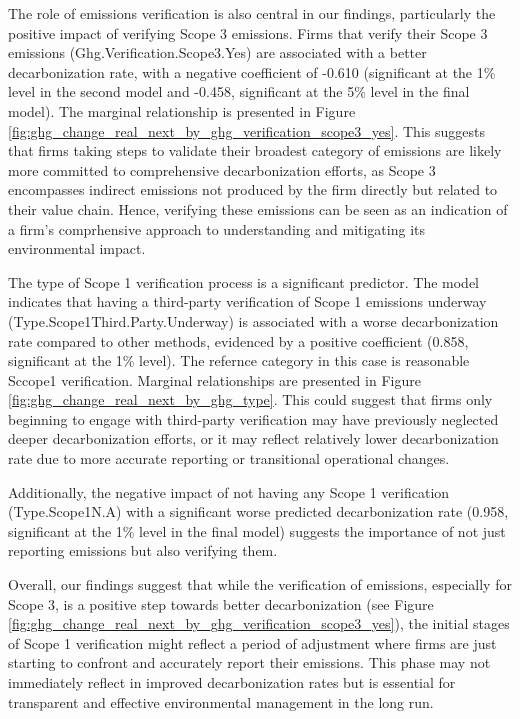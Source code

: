The role of emissions verification is also central in our findings, particularly the positive impact of verifying Scope 3 emissions. Firms that verify their Scope 3 emissions (Ghg.Verification.Scope3.Yes) are associated with a better decarbonization rate, with a negative coefficient of -0.610 (significant at the 1\% level in the second model and -0.458, significant at the 5\% level in the final model). The marginal relationship is presented in Figure \ref{fig:ghg_change_real_next_by_ghg_verification_scope3_yes}. This suggests that firms taking steps to validate their broadest category of emissions are likely more committed to comprehensive decarbonization efforts, as Scope 3 encompasses indirect emissions not produced by the firm directly but related to their value chain. Hence, verifying these emissions can be seen as an indication of a firm's comprhensive approach to understanding and mitigating its environmental impact.


The type of Scope 1 verification process is a significant predictor. The model indicates that having a third-party verification of Scope 1 emissions underway \\ (Type.Scope1Third.Party.Underway) is associated with a worse decarbonization rate compared to other methods, evidenced by a positive coefficient (0.858, significant at the 1\% level). The refernce category in this case is reasonable Sccope1 verification. Marginal relationships are presented in Figure \ref{fig:ghg_change_real_next_by_ghg_type}. This could suggest that firms only beginning to engage with third-party verification may have previously neglected deeper decarbonization efforts, or it may reflect relatively lower decarbonization rate due to more accurate reporting or transitional operational changes.
    

Additionally, the negative impact of not having any Scope 1 verification \\ (Type.Scope1N.A) with a significant worse predicted decarbonization rate (0.958, significant at the 1\% level in the final model) suggests the importance of not just reporting emissions but also verifying them.


Overall, our findings suggest that while the verification of emissions, especially for Scope 3, is a positive step towards better decarbonization (see Figure \ref{fig:ghg_change_real_next_by_ghg_verification_scope3_yes}), the initial stages of Scope 1 verification might reflect a period of adjustment where firms are just starting to confront and accurately report their emissions. This phase may not immediately reflect in improved decarbonization rates but is essential for transparent and effective environmental management in the long run. 
    

